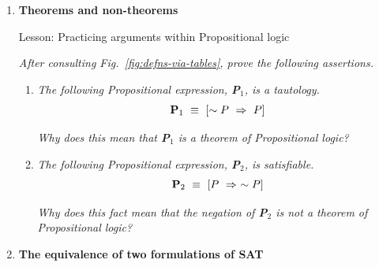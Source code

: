 {\begin{enumerate}
\begin{enumerate}
{\em Hint:}
\begin{itemize}
\item
As you create a new string of numbers, in how many ways can you choose {\em the first number}? {\em the second number}? \ldots
\medskip\item
Based on your answers for the first and second and third numbers of the new string, in how many ways can you choose {\em the first two numbers---i.e., the first {\em pair} of numbers}? {\em the next two numbers}? \ldots
\end{itemize}
  \medskip\item
{\em Strengthen your argument by listing all permutations of  $S' =  \{1,2,3,4,5\}$.}

\smallskip

Write small---there are a lot of permutations.
  \medskip\item
$\oplus \oplus$ {\em Extrapolate from your argument to determine the number of permutations of the set $S" =  \{1,2,3, \ldots, n\}$, as a function of $n$.}
  \end{enumerate}  

\medskip\item
{\bf Theorems and non-theorems}

{\sc Lesson:} Practicing arguments within Propositional logic

\smallskip

{\em
After consulting Fig.~\ref{fig:defns-via-tables}, prove the following assertions.}

\smallskip

\begin{enumerate}
\item
{\em The following Propositional expression, {\bf P}$_1$, is a tautology.}
\[ {\bf P}_1 \ \equiv \ \left[ \sim P \ \Rightarrow \ P \right] \]


\smallskip

{\em Why does this mean that {\bf P}$_1$ is a {\em theorem} of Propositional logic?}

\medskip\item
{\em The following Propositional expression, {\bf P}$_2$, is satisfiable.}
\[ {\bf P}_2 \ \equiv \ \left[ P \ \Rightarrow \ \sim P \right] \]

\smallskip

{\em Why does this fact mean that the {\em negation} of {\bf P}$_2$ is {\em not a theorem} of Propositional logic?}
\end{enumerate}

\medskip\item
{\bf The equivalence of two formulations of SAT}


\end{enumerate}}
